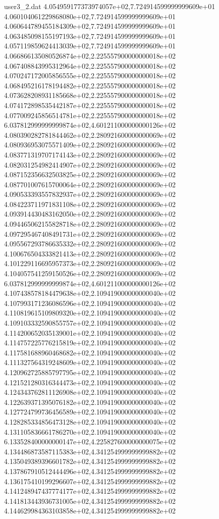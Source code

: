 \begin{filecontents}{user3_2.dat}
4.054959177373974057e+02,7.724914599999999609e+01
4.060104061229868080e+02,7.724914599999999609e+01
4.060644789455184309e+02,7.724914599999999609e+01
4.063485098155197193e+02,7.724914599999999609e+01
4.057119859624413039e+02,7.724914599999999609e+01
4.066866135080526874e+02,2.225557900000000018e+02
4.067408843995312964e+02,2.225557900000000018e+02
4.070247172005856555e+02,2.225557900000000018e+02
4.068495216178194482e+02,2.225557900000000018e+02
4.073628208931185668e+02,2.225557900000000018e+02
4.074172898535442187e+02,2.225557900000000018e+02
4.077009245856514781e+02,2.225557900000000018e+02
6.037812999999999874e+02,4.601211000000000126e+02
4.080390282781844462e+02,2.280921600000000069e+02
4.080936953075571409e+02,2.280921600000000069e+02
4.083771319707174143e+02,2.280921600000000069e+02
4.082031254982414907e+02,2.280921600000000069e+02
4.087152356632503825e+02,2.280921600000000069e+02
4.087701007615700064e+02,2.280921600000000069e+02
4.090533393557832937e+02,2.280921600000000069e+02
4.084223711971831108e+02,2.280921600000000069e+02
4.093914430483162050e+02,2.280921600000000069e+02
4.094465062155828718e+02,2.280921600000000069e+02
4.097295467408491731e+02,2.280921600000000069e+02
4.095567293786635332e+02,2.280921600000000069e+02
4.100676504333821413e+02,2.280921600000000069e+02
4.101229116695957373e+02,2.280921600000000069e+02
4.104057541259150526e+02,2.280921600000000069e+02
6.037812999999999874e+02,4.601211000000000126e+02
4.107438578184479638e+02,2.109419000000000040e+02
4.107993171236086596e+02,2.109419000000000040e+02
4.110819615109809320e+02,2.109419000000000040e+02
4.109103332590855757e+02,2.109419000000000040e+02
4.114200652035139001e+02,2.109419000000000040e+02
4.114757225776215819e+02,2.109419000000000040e+02
4.117581688960468682e+02,2.109419000000000040e+02
4.111327564319248609e+02,2.109419000000000040e+02
4.120962725885797795e+02,2.109419000000000040e+02
4.121521280316344473e+02,2.109419000000000040e+02
4.124343762811126908e+02,2.109419000000000040e+02
4.122639371395076182e+02,2.109419000000000040e+02
4.127724799736456589e+02,2.109419000000000040e+02
4.128285334856473128e+02,2.109419000000000040e+02
4.131105836661786270e+02,2.109419000000000040e+02
6.133528400000000147e+02,4.225827600000000075e+02
4.134486873587115383e+02,4.341254999999999882e+02
4.135049389396601782e+02,4.341254999999999882e+02
4.137867910512444496e+02,4.341254999999999882e+02
4.136175410199296607e+02,4.341254999999999882e+02
4.141248947437774177e+02,4.341254999999999882e+02
4.141813443936731005e+02,4.341254999999999882e+02
4.144629984363103858e+02,4.341254999999999882e+02

\end{filecontents}
